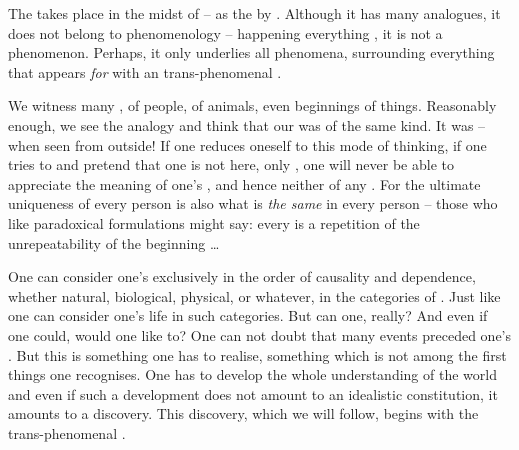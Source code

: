 \pa The   takes place in the midst of
 -- as the  by . Although it has many
 analogues, it does not belong to phenomenology -- happening
 everything , it is not a phenomenon.
Perhaps, it only underlies all phenomena, surrounding everything that appears
{\em for}  with an  trans-phenomenal .

We witness many , of people, of animals, even beginnings of things.
Reasonably enough, we see the analogy and think that our  was of the
same kind.  It was -- when seen from outside!  If one reduces {oneself} to this
mode of thinking, if one tries to  and pretend that
one is not here, only , one will never be able to appreciate the
meaning of one's , and hence neither of any . For the
ultimate uniqueness of every person is also what is {\em the same} in every
person -- those who like paradoxical formulations might say: every
 is a repetition of the unrepeatability of the beginning
\ldots{}

One can consider one's  exclusively in the order of causality and
dependence, whether natural, biological, physical, or whatever, in the
 categories of . Just like one can consider one's
life in such categories. But can one, really? And even if one could, would one
like to? One can not doubt that many events preceded one's . But this
is something one has to realise, something which is not among the first things
one recognises. One has to develop the whole understanding of the world and even if
such a development does not amount to an idealistic constitution, it amounts
 to a discovery. This discovery, which we will follow, begins with the
trans-phenomenal .


